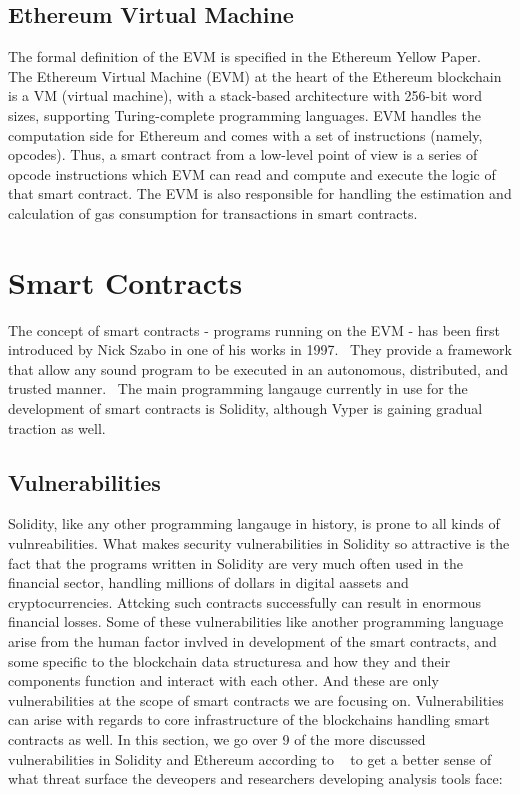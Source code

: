     \subsection{Ethereum Virtual Machine}
        The formal definition of the EVM is specified in the Ethereum Yellow Paper.~\cite{wood2014ethereum}
        The Ethereum Virtual Machine (EVM) at the heart of the Ethereum blockchain is a VM (virtual machine), with a stack-based architecture with 256-bit word sizes, supporting Turing-complete programming languages.
        EVM handles the computation side for Ethereum and comes with a set of instructions (namely, opcodes).
        Thus, a smart contract from a low-level point of view is a series of opcode instructions which EVM can read and compute and execute the logic of that smart contract.
        The EVM is also responsible for handling the estimation and calculation of gas consumption for transactions in smart contracts.


\section{Smart Contracts}
    The concept of smart contracts - programs running on the EVM - has been first introduced by Nick Szabo in one of his works in 1997.~\cite{szabo1997formalizing}
    They provide a framework that allow any sound program to be executed in an autonomous, distributed, and trusted manner.~\cite{nguyen2020sfuzz}
    The main programming langauge currently in use for the development of smart contracts is Solidity, although Vyper is gaining gradual traction as well.

    \subsection{Vulnerabilities}
        Solidity, like any other programming langauge in history, is prone to all kinds of vulnreabilities.
        What makes security vulnerabilities in Solidity so attractive is the fact that the programs written in Solidity are very much often used in the financial sector,
        handling millions of dollars in digital aassets and cryptocurrencies. Attcking such contracts successfully can result in enormous financial losses.
        Some of these vulnerabilities like another programming language arise from the human factor invlved in development of the smart contracts, and some specific to the blockchain data structuresa and how they and their components function and interact with each other.
        And these are only vulnerabilities at the scope of smart contracts we are focusing on. Vulnerabilities can arise with regards to core infrastructure of the blockchains handling smart contracts as well.
        In this section, we go over 9 of the more discussed vulnerabilities in Solidity and Ethereum according to ~\cite{dasp} to get a better sense of what threat surface the deveopers and researchers developing analysis tools face:

